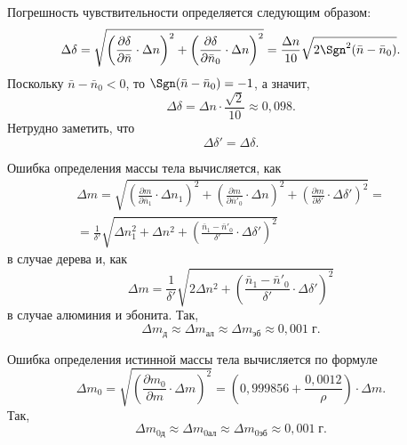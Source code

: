 Погрешность чувствительности определяется следующим образом:
\[
\Delta\delta=\sqrt{\left(\frac{\partial\delta}{\partial \bar n}\cdot\Delta n\right)^2+\left(\frac{\partial\delta}{\partial \bar n_0}\cdot\Delta n\right)^2}=\frac{\Delta n}{10}\sqrt{2\Sgn^2(\bar n-\bar n_0)}.
\]
Поскольку $\bar n-\bar n_0<0$, то $\Sgn(\bar n-\bar n_0)=-1$, а значит,
\[
\Delta\delta=\Delta n\cdot\frac{\sqrt{2}}{10}\approx0{,}098.
\]
Нетрудно заметить, что
\[
\Delta\delta'=\Delta\delta.
\]

Ошибка определения массы тела вычисляется, как
\begin{multline*}
\Delta m=\sqrt{\left(\frac{\partial m}{\partial\bar n_1}\cdot\Delta n_1\right)^2+\left(\frac{\partial m}{\partial\bar n'_0}\cdot\Delta n\right)^2+\left(\frac{\partial m}{\partial\delta'}\cdot\Delta\delta'\right)^2}= \\
=\frac{1}{\delta'}\sqrt{\Delta n_1^2+\Delta n^2+\left(\frac{\bar n_1-\bar n'_0}{\delta'}\cdot\Delta\delta'\right)^2}
\end{multline*}
в случае дерева и, как
\[
\Delta m=\frac{1}{\delta'}\sqrt{2\Delta n^2+\left(\frac{\bar n_1-\bar n'_0}{\delta'}\cdot\Delta\delta'\right)^2}
\]
в случае алюминия и эбонита. Так,
\[
\Delta m_\text{д}\approx\Delta m_\text{ал}\approx\Delta m_\text{эб}\approx0{,}001\;\text{г}.
\]

Ошибка определения истинной массы тела вычисляется по формуле
\[
\Delta m_0=\sqrt{\left(\frac{\partial m_0}{\partial m}\cdot\Delta m\right)^2}=\left(0{,}999856+\frac{0{,}0012}{\rho}\right)\cdot\Delta m.
\]
Так,
\[
\Delta m_{0\text{д}}\approx\Delta m_{0\text{ал}}\approx\Delta m_{0\text{эб}}\approx0{,}001\;\text{г}.
\]